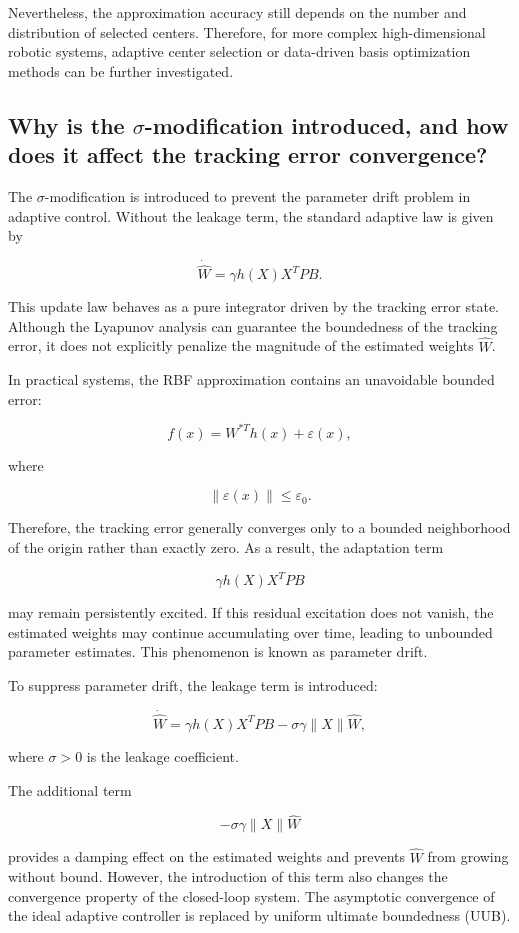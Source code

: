 Nevertheless, the approximation accuracy still depends on the number and distribution of selected centers. Therefore, for more complex high-dimensional robotic systems, adaptive center selection or data-driven basis optimization methods can be further investigated.

\subsection{Why is the $\sigma$-modification introduced, and how does it affect the tracking error convergence?}

The $\sigma$-modification is introduced to prevent the parameter drift problem in adaptive control. 
Without the leakage term, the standard adaptive law is given by

\[
\dot{\hat W}
=
\gamma h(X)X^{T}PB .
\]

This update law behaves as a pure integrator driven by the tracking error state. Although the Lyapunov analysis can guarantee the boundedness of the tracking error, it does not explicitly penalize the magnitude of the estimated weights $\hat W$.

In practical systems, the RBF approximation contains an unavoidable bounded error:

\[
f(x)=W^{*T}h(x)+\varepsilon(x),
\]

where

\[
\|\varepsilon(x)\|\leq\varepsilon_0 .
\]

Therefore, the tracking error generally converges only to a bounded neighborhood of the origin rather than exactly zero. As a result, the adaptation term

\[
\gamma h(X)X^{T}PB
\]

may remain persistently excited. If this residual excitation does not vanish, the estimated weights may continue accumulating over time, leading to unbounded parameter estimates. This phenomenon is known as parameter drift.


To suppress parameter drift, the leakage term is introduced:

\[
\dot{\hat W}
=
\gamma h(X)X^{T}PB
-
\sigma\gamma\|X\|\hat W ,
\]

where $\sigma>0$ is the leakage coefficient.

The additional term

\[
-\sigma\gamma\|X\|\hat W
\]

provides a damping effect on the estimated weights and prevents $\hat W$ from growing without bound. However, the introduction of this term also changes the convergence property of the closed-loop system. The asymptotic convergence of the ideal adaptive controller is replaced by uniform ultimate boundedness (UUB).


